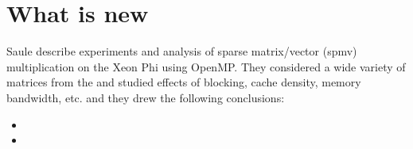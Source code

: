 \section{What is new}
Saule \etal \cite{} describe experiments and analysis of sparse matrix/vector (spmv) multiplication on the Xeon Phi using OpenMP. They considered a wide variety of matrices from the  and studied effects of blocking, cache density, memory bandwidth, etc. and they drew the following
conclusions: 
\begin{itemize}
\item 
\item 
\end{itemize}
